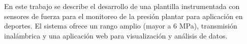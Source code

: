 En este trabajo se describe el desarrollo de una plantilla instrumentada con sensores de fuerza para el monitoreo de la presión plantar para aplicación en deportes. El sistema ofrece un rango amplio (mayor a 6 MPa), transmisión inalámbrica y una aplicación web para visualización y análisis de datos. 